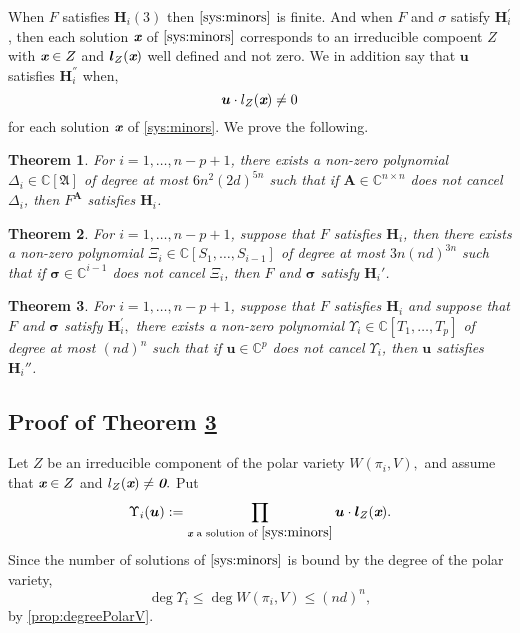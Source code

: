 \documentclass[a4paper]{article}
\def\A{\mathfrak{A}}
\def\bz{\textit{\textbf{0}}}
\def\mA{{\bm A}}
\def\ub{{\bm u}}
\def\lb{{\bm l}}
\def\xb{\textit{\textbf{x}}}
\def\D{\Delta}
\def\C{\mathbb{C}}
\newtheorem{theorem}{Theorem}[section]
\begin{document}
\noindent 
When $F$ satisfies $\bm H_i(3)$ then $\eqref{sys:minors}$ is finite. And when $F$ and $\sigma$ satisfy $\bm H_i^{'}$, then each solution $\xb$ of $\eqref{sys:minors}$ corresponds to an irreducible compoent $Z$ with $\xb \in Z$ and $\lb_Z(\xb)$ well defined and not zero. We in addition say that $\bm u$ satisfies $\bm H_i^{''}$ when, 
\[
\ub \cdot l_Z(\xb) \not = 0
\]
for each solution $\xb$ of \eqref{sys:minors}.
\noindent 
We prove the following.  
%
\begin{theorem}\label{theo:NoetherPositionG}
  For $i=1,\dots,n-p+1$, there exists a non-zero polynomial $\D_i\in\C[\A]$ of degree at most $6n^2(2d)^{5n}$ such that if $\mA \in
  \C^{n\times n}$ does not cancel $\D_i$, then
  $F^\mA$ satisfies $\textbf{H}_i$.
\end{theorem}
%
\begin{theorem}\label{theo:sigmaG}
  For $i=1,\dots,n-p+1$, suppose that $F$ satisfies $\textbf{H}_i$, then there exists a non-zero
  polynomial $\Xi_{i} \in \C[S_1,\dots,S_{i-1}]$ of degree at most
  $3n(nd)^{3n}$ such that if $\bm \sigma \in \C^{i-1}$ does not
  cancel $\Xi_{i}$, then $F$ and $\bm \sigma$ satisfy $\textbf{H}_i'$.
\end{theorem}
%
\begin{theorem}\label{the:u}
  For $i=1,\dots,n-p+1$, suppose that $F$ satisfies $\textbf{H}_i$ and suppose that $F$ and $\bm \sigma$ satisfy $\textbf{H}_i^{'},$ there exists a non-zero
  polynomial $\Upsilon_{i} \in \C[T_1,\dots,T_{p}]$ of degree at most $(nd)^{n}$ such that if $\bm u \in \C^{p}$ does not
  cancel $\Upsilon_{i}$, then $\bm u$ satisfies $\textbf{H}_i{''}$.
\end{theorem}
%

\subsection{Proof of Theorem \ref{the:u}}
Let $Z$ be an irreducible component of the polar variety $W(\pi_i,V),$ and assume that $\xb \in Z$ and $l_Z(\xb) \not = \bz.$ Put
\[
\Upsilon_i(\ub) := \prod_{\xb \textrm{ a solution of } \eqref{sys:minors}} \ub \cdot \lb_Z(\xb).
\]
%
Since the number of solutions of $\eqref{sys:minors}$ is bound by the degree of the polar variety, 
\[
\deg \Upsilon_i \leq \deg W(\pi_i,V) \leq (nd)^{n},
\]
by \ref{prop:degreePolarV}.
\end{document}
